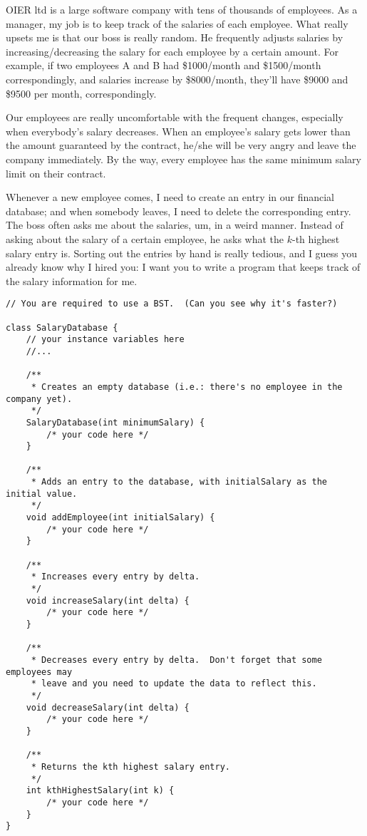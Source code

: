 \documentclass{article}
\begin{document}
OIER ltd is a large software company with tens of thousands of employees.  As a manager, my job is to keep track of the salaries of each employee.  What really upsets me is that our boss is really random.  He frequently adjusts salaries by increasing/decreasing the salary for each employee by a certain amount. For example, if two employees A and B had \$1000/month and \$1500/month correspondingly, and salaries increase by \$8000/month, they'll have \$9000 and \$9500 per month, correspondingly.

Our employees are really uncomfortable with the frequent changes, especially when everybody's salary decreases.  When an employee's salary gets lower than the amount guaranteed by the contract, he/she will be very angry and leave the company immediately.  By the way, every employee has the same minimum salary limit on their contract.

Whenever a new employee comes, I need to create an entry in our financial database; and when somebody leaves, I need to delete the corresponding entry.  The boss often asks me about the salaries, um, in a weird manner.  Instead of asking about the salary of a certain employee, he asks what the $k$-th highest salary entry is.  Sorting out the entries by hand is really tedious, and I guess you already know why I hired you: I want you to write a program that keeps track of the salary information for me.

\begin{verbatim}
// You are required to use a BST.  (Can you see why it's faster?)

class SalaryDatabase {
    // your instance variables here
    //...

    /**
     * Creates an empty database (i.e.: there's no employee in the company yet).
     */
    SalaryDatabase(int minimumSalary) {
        /* your code here */
    }

    /**
     * Adds an entry to the database, with initialSalary as the initial value.
     */
    void addEmployee(int initialSalary) {
        /* your code here */
    }

    /**
     * Increases every entry by delta.
     */
    void increaseSalary(int delta) {
        /* your code here */
    }

    /**
     * Decreases every entry by delta.  Don't forget that some employees may
     * leave and you need to update the data to reflect this.
     */
    void decreaseSalary(int delta) {
        /* your code here */
    }

    /**
     * Returns the kth highest salary entry.
     */
    int kthHighestSalary(int k) {
        /* your code here */
    }
}
\end{verbatim}










\end{document}
